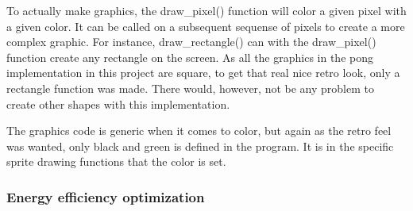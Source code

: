 To actually make graphics, the draw\_pixel() function will color a given pixel
with a given color.  It can be called on a subsequent sequense of pixels to
create a more complex graphic.  For instance, draw\_rectangle() can with the
draw\_pixel() function create any rectangle on the screen.  As all the graphics
in the pong implementation in this project are square, to get that real nice
retro look, only a rectangle function was made.  There would, however, not be
any problem to create other shapes with this implementation.

The graphics code is generic when it comes to color, but again as the retro
feel was wanted, only black and green is defined in the program.  It is in the
specific sprite drawing functions that the color is set.

\subsubsection{Energy efficiency optimization}
